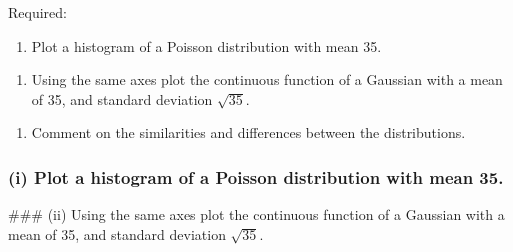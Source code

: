 \documentclass[11pt]{article}
\providecommand{\tightlist}{%
      \setlength{\itemsep}{0pt}\setlength{\parskip}{0pt}}
\begin{document}
Required:

\begin{enumerate}
\def\labelenumi{(\roman{enumi})}
\tightlist
\item
  Plot a histogram of a Poisson distribution with mean 35.\\
\end{enumerate}

\begin{enumerate}
\def\labelenumi{(\roman{enumi})}
\setcounter{enumi}{1}
\tightlist
\item
  Using the same axes plot the continuous function of a Gaussian with a
  mean of 35, and standard deviation \(\sqrt{35}\).\\
\end{enumerate}

\begin{enumerate}
\def\labelenumi{(\roman{enumi})}
\setcounter{enumi}{2}
\tightlist
\item
  Comment on the similarities and differences between the distributions.
\end{enumerate}

    \hypertarget{i-plot-a-histogram-of-a-poisson-distribution-with-mean-35.}{%
\subsubsection{(i) Plot a histogram of a Poisson distribution with mean
35.}\label{i-plot-a-histogram-of-a-poisson-distribution-with-mean-35.}}

 \#\#\# (ii) Using the same axes plot the continuous function of a
Gaussian with a mean of 35, and standard deviation \(\sqrt{35}\).
\end{document}
